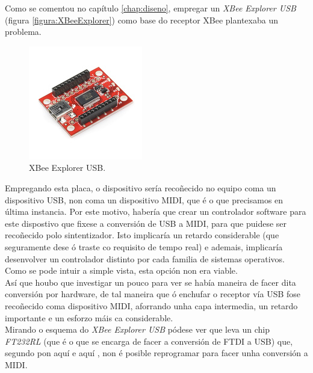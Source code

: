     Como se comentou no capítulo \ref{chap:diseno}, empregar un
    \textit{XBee Explorer USB} \cite{XBeeExplorer} (figura
    \ref{figura:XBeeExplorer}) como base do receptor XBee plantexaba un
    problema.

    \begin{figure}[htbp]
     \centering
     \includegraphics[scale=3.0,keepaspectratio=true]{./imagenes/xbee-explorer.jpg}
     \caption{XBee Explorer USB.}
     \label{figura:XBeeExplorer2}
    \end{figure}

    Empregando esta placa, o dispositivo sería recoñecido no equipo coma un
    dispositivo USB, non coma un dispositivo MIDI, que é o que precisamos en
    última instancia. Por este motivo, habería que crear un controlador
    software para este dispostivo que fixese a conversión de USB a MIDI, para
    que puidese ser recoñecido polo sintentizador. Isto implicaría un retardo
    considerable (que seguramente dese ó traste co requisito de tempo real) e
    ademais, implicaría desenvolver un controlador distinto por cada familia de
    sistemas operativos. Como se pode intuir a simple vista, esta opción non
    era viable. \\

    Así que houbo que investigar un pouco para ver se había maneira de facer
    dita conversión por hardware, de tal maneira que ó enchufar o receptor vía
    USB fose recoñecido coma dispositivo MIDI, aforrando unha capa intermedia,
    un retardo importante e un esforzo máis ca considerable. \\

    Mirando o esquema do \textit{XBee Explorer USB} pódese ver que leva un chip
    \textit{FT232RL} (que é o que se encarga de facer a conversión de FTDI a
    USB) que, segundo pon aquí \cite{FT232RL} e aquí \cite{Moco}, non é posible
    reprogramar para facer unha conversión a MIDI. \\

